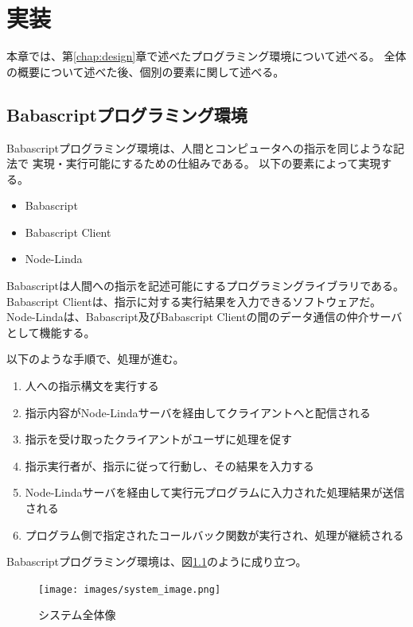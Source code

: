 \chapter{実装}\label{chap:implementation}

本章では、第\ref{chap:design}章で述べたプログラミング環境について述べる。
全体の概要について述べた後、個別の要素に関して述べる。

\section{Babascriptプログラミング環境}\label{babascriptux30d7ux30edux30b0ux30e9ux30dfux30f3ux30b0ux74b0ux5883}

Babascriptプログラミング環境は、人間とコンピュータへの指示を同じような記法で
実現・実行可能にするための仕組みである。 以下の要素によって実現する。

\begin{itemize}
\itemsep1pt\parskip0pt
\item
  Babascript
\item
  Babascript Client
\item
  Node-Linda
\end{itemize}

Babascriptは人間への指示を記述可能にするプログラミングライブラリである。
Babascript Clientは、指示に対する実行結果を入力できるソフトウェアだ。
Node-Lindaは、Babascript及びBabascript
Clientの間のデータ通信の仲介サーバとして機能する。

以下のような手順で、処理が進む。

\begin{enumerate}
\def\labelenumi{\arabic{enumi}.}
\itemsep1pt\parskip0pt
\item
  人への指示構文を実行する
\item
  指示内容がNode-Lindaサーバを経由してクライアントへと配信される
\item
  指示を受け取ったクライアントがユーザに処理を促す
\item
  指示実行者が、指示に従って行動し、その結果を入力する
\item
  Node-Lindaサーバを経由して実行元プログラムに入力された処理結果が送信される
\item
  プログラム側で指定されたコールバック関数が実行され、処理が継続される
\end{enumerate}

Babascriptプログラミング環境は、図\ref{fig:system_image}のように成り立つ。

\begin{figure}[htbp]
  \begin{center}
  \texttt{[image: images/system\_image.png]}
  \end{center}
  \caption{システム全体像}
  \label{fig:system_image}
\end{figure}

